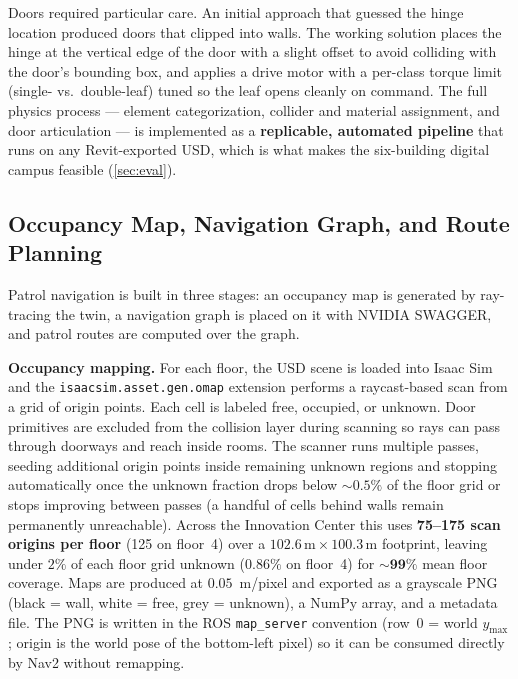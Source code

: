 \documentclass[10pt,twocolumn,letterpaper]{article}
\begin{document}
Doors required particular care. An initial approach that guessed the hinge
location produced doors that clipped into walls. The working solution places the
hinge at the vertical edge of the door with a slight offset to avoid colliding
with the door's bounding box, and applies a drive motor with a per-class torque
limit (single- vs.\ double-leaf) tuned so the leaf opens cleanly on command. The full physics process --- element categorization, collider and
material assignment, and door articulation --- is implemented as a
\textbf{replicable, automated pipeline} that runs on any Revit-exported USD, which
is what makes the six-building digital campus feasible (\cref{sec:eval}).

\subsection{Occupancy Map, Navigation Graph, and Route Planning}
\label{sec:nav-graph}

Patrol navigation is built in three stages: an occupancy map is generated by
ray-tracing the twin, a navigation graph is placed on it with NVIDIA SWAGGER, and
patrol routes are computed over the graph.

\noindent\textbf{Occupancy mapping.}
For each floor, the USD scene is loaded into Isaac Sim and the
\texttt{isaacsim.asset.gen.omap} extension performs a raycast-based scan from a
grid of origin points. Each cell is labeled free, occupied, or unknown. Door
primitives are excluded from the collision layer during scanning so rays can pass
through doorways and reach inside rooms. The scanner runs multiple passes, seeding
additional origin points inside remaining unknown regions and stopping
automatically once the unknown fraction drops below $\sim0.5\%$ of the floor grid
or stops improving between passes (a handful of cells behind walls remain
permanently unreachable). Across the Innovation Center this uses
\textbf{75--175 scan origins per floor} (125 on floor~4) over a
$102.6\,\text{m}\times100.3\,\text{m}$ footprint, leaving under $2\%$ of each
floor grid unknown ($0.86\%$ on floor~4) for $\mathbf{{\sim}99\%}$ mean floor
coverage. Maps are
produced at $0.05$~m/pixel and exported as a grayscale PNG (black = wall, white =
free, grey = unknown), a NumPy array, and a metadata file. The PNG is written in
the ROS \texttt{map\_server} convention (row~0 = world $y_{\max}$; origin is the
world pose of the bottom-left pixel) so it can be consumed directly by Nav2
without remapping.
\end{document}
